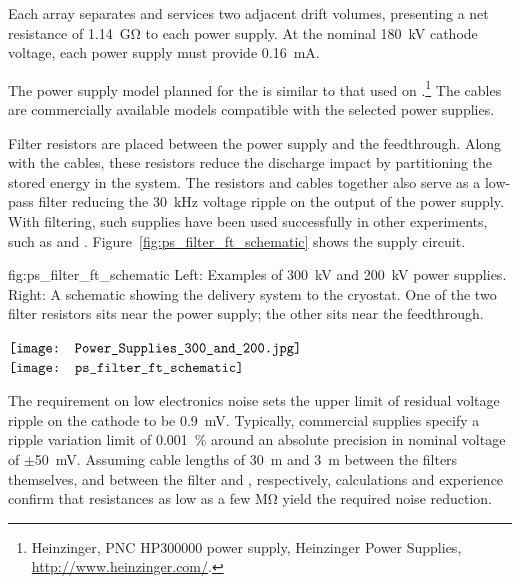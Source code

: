 Each  array separates and services two adjacent drift volumes, 
presenting a net resistance of \SI{1.14}{\giga\ohm} to each power supply. At the nominal \SI{180}{kV} cathode voltage, each power supply must provide \SI{0.16}{mA}.

The power supply model planned for the  is similar to that used on .\footnote{Heinzinger, PNC HP300000  power supply, Heinzinger\texttrademark{} Power Supplies, \url{http://www.heinzinger.com/}.}  
The  cables are commercially available models compatible with the selected power supplies. 


Filter resistors are placed between the power supply and the feedthrough.  Along with the cables, these resistors reduce the discharge impact by partitioning the stored energy in the system.  The resistors and cables together also serve as a low-pass filter reducing 
the \SI{30}{kHz} voltage ripple on the output of the power supply.  With filtering, such supplies have been used successfully in other \lartpc experiments, such as \microboone and . Figure~\ref{fig:ps_filter_ft_schematic} shows the  supply circuit.

\begin{dunefigure}  
{fig:ps_filter_ft_schematic}
{Left: Examples of \SI{300}{kV} and \SI{200}{kV} power supplies. %
Right:  A schematic showing the  delivery system to the cryostat. %
One of the two filter resistors sits near the power supply; the other sits near the feedthrough.}
\begin{minipage}{\textwidth}%
  \centering
 $\vcenter{\hbox{\texttt{[image: Power\_Supplies\_300\_and\_200.jpg]}}}$
 \hspace*{0.001\textwidth}  $\vcenter{\hbox{\texttt{[image: ps\_filter\_ft\_schematic]}}}$
\end{minipage}
\end{dunefigure}
The requirement  
on low electronics noise sets the upper limit of residual voltage ripple on the cathode to be \SI{0.9}{mV}. 
Typically, commercial supplies specify a ripple variation limit of 
\SI{.001}{\%} around an absolute precision in nominal voltage of $\pm$\SI{50}{mV}.
%
Assuming cable lengths of \SI{30}{m} and \SI{3}{m} between the filters themselves, and between the filter and \fdth, respectively, calculations and experience confirm that resistances as low as a few \si{\mega\ohm} yield the required noise reduction. 

